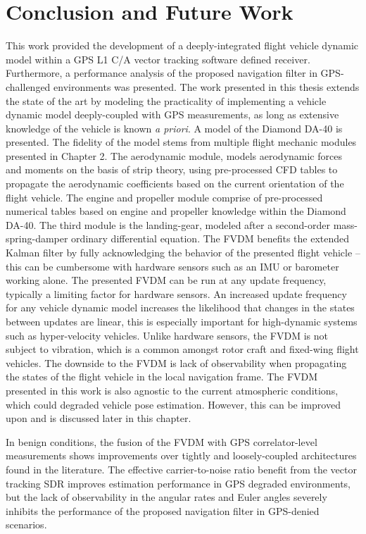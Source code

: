 \chapter{Conclusion and Future Work}
This work provided the development of a deeply-integrated flight vehicle dynamic model within a GPS L1 C/A vector tracking software defined receiver. Furthermore, a performance analysis of the proposed navigation filter in GPS-challenged environments was presented. The work presented in this thesis extends the state of the art by modeling the practicality of implementing a vehicle dynamic model deeply-coupled with GPS measurements, as long as extensive knowledge of the vehicle is known \textit{a priori}. A model of the Diamond DA-40 is presented. The fidelity of the model stems from multiple flight mechanic modules presented in Chapter 2. The aerodynamic module, models aerodynamic forces and moments on the basis of strip theory, using pre-processed CFD tables to propagate the aerodynamic coefficients based on the current orientation of the flight vehicle. The engine and propeller module comprise of pre-processed numerical tables based on engine and propeller knowledge within the Diamond DA-40. The third module is the landing-gear, modeled after a second-order mass-spring-damper ordinary differential equation. The FVDM benefits the extended Kalman filter by fully acknowledging the behavior of the presented flight vehicle {--} this can be cumbersome with hardware sensors such as an IMU or barometer working alone. The presented FVDM can be run at any update frequency, typically a limiting factor for hardware sensors. An increased update frequency for any vehicle dynamic model increases the likelihood that changes in the states between updates are linear, this is especially important for high-dynamic systems such as hyper-velocity vehicles. Unlike hardware sensors, the FVDM is not subject to vibration, which is a common amongst rotor craft and fixed-wing flight vehicles. The downside to the FVDM is lack of observability when propagating the states of the flight vehicle in the local navigation frame. The FVDM presented in this work is also agnostic to the current atmospheric conditions, which could degraded vehicle pose estimation. However, this can be improved upon and is discussed later in this chapter.

In benign conditions, the fusion of the FVDM with GPS correlator-level measurements shows improvements over tightly and loosely-coupled architectures found in the literature. The effective carrier-to-noise ratio benefit from the vector tracking SDR improves estimation performance in GPS degraded environments, but the lack of observability in the angular rates and Euler angles severely inhibits the performance of the proposed navigation filter in GPS-denied scenarios.
